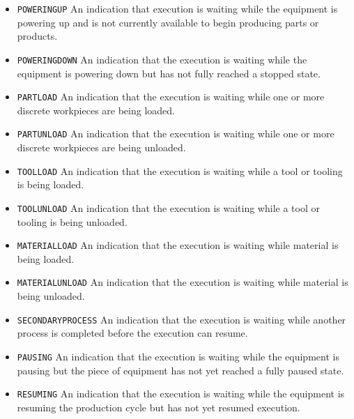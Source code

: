 \begin{itemize}
\item \texttt{POWERING\textunderscore UP} \newline An indication that execution is waiting while the equipment is powering up and is not currently available to begin producing parts or products. 
\item \texttt{POWERING\textunderscore DOWN} \newline An indication that the execution is waiting while the equipment is powering down but has not fully reached a stopped state. 
\item \texttt{PART\textunderscore LOAD} \newline An indication that the execution is waiting while one or more discrete workpieces are being loaded. 
\item \texttt{PART\textunderscore UNLOAD} \newline An indication that the execution is waiting while one or more discrete workpieces are being unloaded. 
\item \texttt{TOOL\textunderscore LOAD} \newline An indication that the execution is waiting while a tool or tooling is being loaded. 
\item \texttt{TOOL\textunderscore UNLOAD} \newline An indication that the execution is waiting while a tool or tooling is being unloaded. 
\item \texttt{MATERIAL\textunderscore LOAD} \newline An indication that the execution is waiting while material is being loaded. 
\item \texttt{MATERIAL\textunderscore UNLOAD} \newline An indication that the execution is waiting while material is being unloaded. 
\item \texttt{SECONDARY\textunderscore PROCESS} \newline An indication that the execution is waiting while another process is completed before the execution can resume. 
\item \texttt{PAUSING} \newline An indication that the execution is waiting while the equipment is pausing but the piece of equipment has not yet reached a fully paused state. 
\item \texttt{RESUMING} \newline An indication that the execution is waiting while the equipment is resuming the production cycle but has not yet resumed execution. 
\end{itemize}



